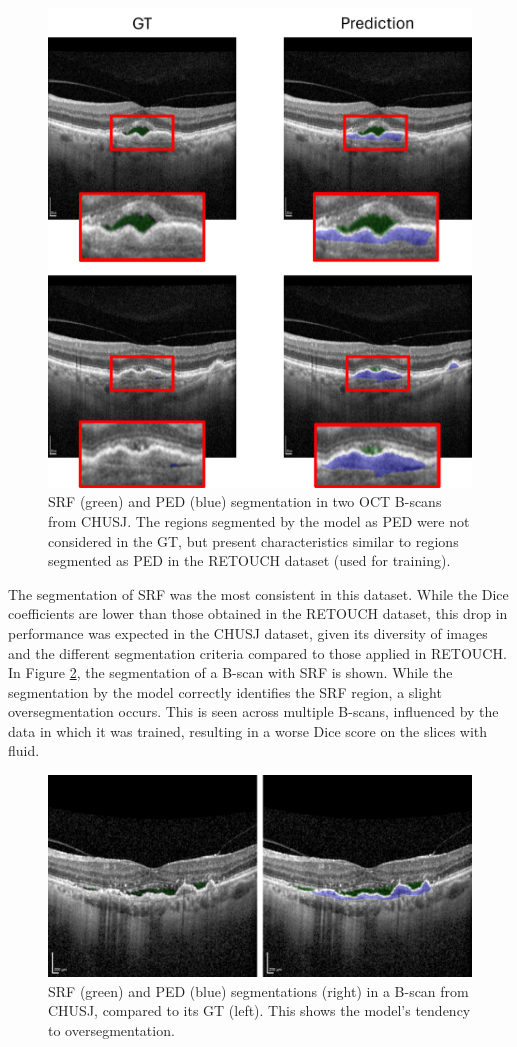 \begin{figure}[!ht]
	\centering
	\includegraphics[width=0.65\linewidth]{figures/CHUSJPEDSegmentation.png}
	\caption{SRF (green) and PED (blue) segmentation in two OCT B-scans from CHUSJ. The regions segmented by the model as PED were not considered in the GT, but present characteristics similar to regions segmented as PED in the RETOUCH dataset (used for training).}
	\label{fig:CHUSJPEDSegmentation}
\end{figure}

The segmentation of SRF was the most consistent in this dataset. While the Dice coefficients are lower than those obtained in the RETOUCH dataset, this drop in performance was expected in the CHUSJ dataset, given its diversity of images and the different segmentation criteria compared to those applied in RETOUCH. In Figure \ref{fig:CHUSJSRFSegmentation}, the segmentation of a B-scan with SRF is shown. While the segmentation by the model correctly identifies the SRF region, a slight oversegmentation occurs. This is seen across multiple B-scans, influenced by the data in which it was trained, resulting in a worse Dice score on the slices with fluid.

\begin{figure}[!ht]
	\centering
	\includegraphics[width=0.60\linewidth]{figures/CHUSJSRFSegmentation.png}
	\caption{SRF (green) and PED (blue) segmentations (right) in a B-scan from CHUSJ, compared to its GT (left). This shows the model's tendency to oversegmentation.}
	\label{fig:CHUSJSRFSegmentation}
\end{figure}

